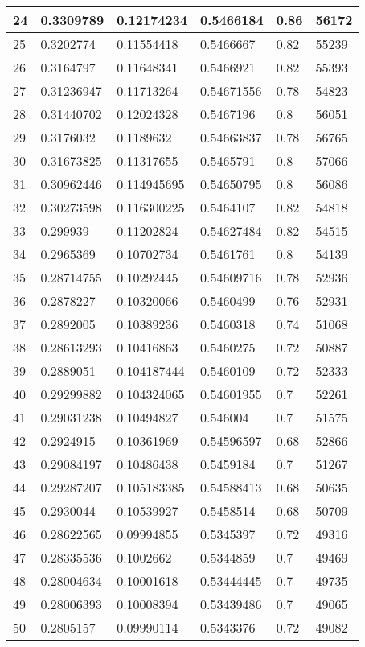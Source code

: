 \begin{longtable}{|l|l|l|l|l|l|}
24 & 0.3309789 & 0.12174234 & 0.5466184 & 0.86 & 56172 \\ \hline 
25 & 0.3202774 & 0.11554418 & 0.5466667 & 0.82 & 55239 \\ \hline 
26 & 0.3164797 & 0.11648341 & 0.5466921 & 0.82 & 55393 \\ \hline 
27 & 0.31236947 & 0.11713264 & 0.54671556 & 0.78 & 54823 \\ \hline 
28 & 0.31440702 & 0.12024328 & 0.5467196 & 0.8 & 56051 \\ \hline 
29 & 0.3176032 & 0.1189632 & 0.54663837 & 0.78 & 56765 \\ \hline 
30 & 0.31673825 & 0.11317655 & 0.5465791 & 0.8 & 57066 \\ \hline 
31 & 0.30962446 & 0.114945695 & 0.54650795 & 0.8 & 56086 \\ \hline 
32 & 0.30273598 & 0.116300225 & 0.5464107 & 0.82 & 54818 \\ \hline 
33 & 0.299939 & 0.11202824 & 0.54627484 & 0.82 & 54515 \\ \hline 
34 & 0.2965369 & 0.10702734 & 0.5461761 & 0.8 & 54139 \\ \hline 
35 & 0.28714755 & 0.10292445 & 0.54609716 & 0.78 & 52936 \\ \hline 
36 & 0.2878227 & 0.10320066 & 0.5460499 & 0.76 & 52931 \\ \hline 
37 & 0.2892005 & 0.10389236 & 0.5460318 & 0.74 & 51068 \\ \hline 
38 & 0.28613293 & 0.10416863 & 0.5460275 & 0.72 & 50887 \\ \hline 
39 & 0.2889051 & 0.104187444 & 0.5460109 & 0.72 & 52333 \\ \hline 
40 & 0.29299882 & 0.104324065 & 0.54601955 & 0.7 & 52261 \\ \hline 
41 & 0.29031238 & 0.10494827 & 0.546004 & 0.7 & 51575 \\ \hline 
42 & 0.2924915 & 0.10361969 & 0.54596597 & 0.68 & 52866 \\ \hline 
43 & 0.29084197 & 0.10486438 & 0.5459184 & 0.7 & 51267 \\ \hline 
44 & 0.29287207 & 0.105183385 & 0.54588413 & 0.68 & 50635 \\ \hline 
45 & 0.2930044 & 0.10539927 & 0.5458514 & 0.68 & 50709 \\ \hline 
46 & 0.28622565 & 0.09994855 & 0.5345397 & 0.72 & 49316 \\ \hline 
47 & 0.28335536 & 0.1002662 & 0.5344859 & 0.7 & 49469 \\ \hline 
48 & 0.28004634 & 0.10001618 & 0.53444445 & 0.7 & 49735 \\ \hline 
49 & 0.28006393 & 0.10008394 & 0.53439486 & 0.7 & 49065 \\ \hline 
50 & 0.2805157 & 0.09990114 & 0.5343376 & 0.72 & 49082 \\ \hline 
\end{longtable}